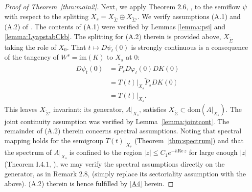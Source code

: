 \documentclass[a4paper, 12pt, oneside, reqno, notitlepage]{amsart}
\theoremstyle{plain}
\theoremstyle{definition}
\theoremstyle{remark}
\newcommand{\dom}{\mathrm{dom}}
\newcommand{\im}{\mathrm{im}}
\begin{document}
\begin{proof}[Proof of Theorem~\ref{thm:main2}]
    Next, we apply Theorem 2.6, \cite{buza2025smooth}, to the semiflow $\psi$ with respect to the splitting $X_s = X_{\widetilde{\Sigma}} \oplus X_{\widetilde{\Sigma}'}$.
    We verify assumptions (A.1) and (A.2) of \cite{buza2025smooth}.
    The contents of (A.1) were verified by Lemmas \ref{lemma:psi} and \ref{lemma:LyapstabCkb}.
    The splitting for (A.2) therein is provided above,   $X_{\widetilde{\Sigma}}$ taking the role of $X_0$.
    That $t \mapsto D\psi_t(0)$ is strongly continuous is a consequence of the tangency of $W^s = \im(K)$ to $X_s$ at $0$:
    \begin{align*}
    D \psi_t(0) &= \widetilde{P}_s D \varphi_t(0)DK(0) \\
                &= T(t)|_{X_s} \widetilde{P}_sDK(0) \\
                &= T(t)|_{X_s}.
    \end{align*}
    This leaves  $X_{\widetilde{\Sigma}'}$ invariant; its generator, $A|_{X_s}$, satisfies $X_{\widetilde{\Sigma}} \subset\dom(A|_{X_s})$.
    The joint continuity assumption was verified by Lemma~\ref{lemma:jointcont}. 
    The remainder of (A.2) therein concerns spectral assumptions.
    Noting that spectral mapping holds for the semigroup $T(t)|_{X_s}$ (Theorem~\ref{thm:spectrum}) and that the spectrum of $A|_{X_s}$ is confined to the region $|z| \leq C_1 e^{-h \mathrm{Re} \, z} $ for large enough $|z|$ (Theorem I.4.1, \cite{diekmann2012delay}), we may verify the spectral assumptions directly on the generator, as in Remark 2.8, \cite{buza2025smooth} (simply replace its sectoriality assumption with the above). 
    (A.2) therein is hence fulfilled by \ref{A4} herein.


\end{proof}
\end{document}
